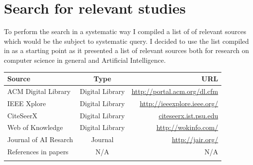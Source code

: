 \documentclass[a4paper]{book}
\begin{document}


\section{Search for relevant studies}

To perform the search in a systematic way I compiled a list of of relevant sources which would be the subject to systematic query. I decided to use the list compiled in \cite{Lillegraven_design_2010} as a starting point as it presented a list of relevant sources both for research on computer science in general and Artificial Intelligence. 
 


\begin{center}
    \begin{tabular}{|l|c|r|}
    \hline
    Source                  &   Type                        & URL \\ \hline \hline
    ACM Digital Library     &   Digital Library             & \url{http://portal.acm.org/dl.cfm} \\  \hline %
    IEEE Xplore             &   Digital Library             & \url{http://ieeexplore.ieee.org/} \\ \hline   %
    CiteSeerX               &   Digital Library             & \url{citeseerx.ist.psu.edu} \\ \hline         %
    Web of Knowledge        &   Digital Library             & \url{http://wokinfo.com/} \\ \hline           %
    Journal of AI Resarch   &   Journal                     & \url{http://jair.org/} \\  \hline      %
    References in papers    &   N/A                         & N/A \\\hline
    \label{table:sources}
    \end{tabular}
\end{center}
\end{document}
